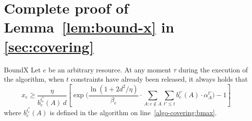 \section{Complete proof of Lemma~\ref{lem:bound-x} in \cref{sec:covering}} \label{apix:lemma-proof}
\setcounter{theorem}{0}
\begin{lemma}{BoundX}
	Let $e$ be an arbitrary resource.
	At any moment $\tau$ during the execution of the algorithm,
	when $t$ constraints have already been released, it always holds that
	$$
	x_{e}	\geq  \frac{\eta}{b^{t_{e}^{*}}_{e}(A) \ d}
			\left[ \exp\biggl( \frac{\ln(1+2d^{2}/\eta)}{\beta_{e}}
					\cdot \sum_{A: e \notin A} \sum_{t' \le t} b^{t'}_{e}(A) \cdot \alpha^{t'}_{A} \biggr) - 1 \right]
	$$
	where $b^{t_{e}^{*}}_{e}(A)$ is defined in the algorithm on line~\ref{algo-covering:bmax}.
\end{lemma}
